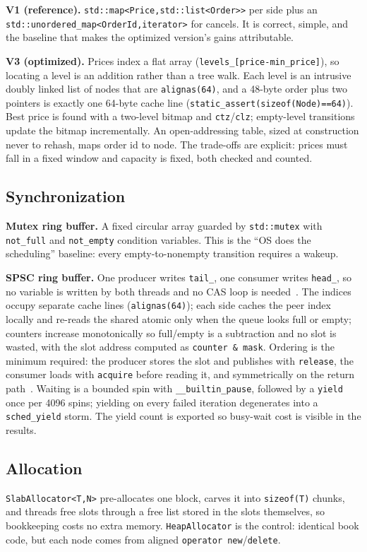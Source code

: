 \documentclass[conference]{IEEEtran}
\begin{document}
\textbf{V1 (reference).} \texttt{std::map<Price,std::list<Order>>} per side plus
an \texttt{std::unordered\_map<OrderId,iterator>} for cancels. It is correct,
simple, and the baseline that makes the optimized version's gains attributable.

\textbf{V3 (optimized).} Prices index a flat array
(\texttt{levels\_[price-min\_price]}), so locating a level is an addition rather
than a tree walk. Each level is an intrusive doubly linked list of nodes that are
\texttt{alignas(64)}, and a 48-byte order plus two pointers is exactly one
64-byte cache line (\texttt{static\_assert(sizeof(Node)==64)}). Best price is
found with a two-level bitmap and \texttt{ctz}/\texttt{clz}; empty-level
transitions update the bitmap incrementally. An open-addressing table, sized at
construction never to rehash, maps order id to node. The trade-offs are explicit:
prices must fall in a fixed window and capacity is fixed, both checked and
counted.

\subsection{Synchronization}
\textbf{Mutex ring buffer.} A fixed circular array guarded by
\texttt{std::mutex} with \texttt{not\_full} and \texttt{not\_empty} condition
variables. This is the ``OS does the scheduling'' baseline: every
empty-to-nonempty transition requires a wakeup.

\textbf{SPSC ring buffer.} One producer writes \texttt{tail\_}, one consumer
writes \texttt{head\_}, so no variable is written by both threads and no CAS loop
is needed~\cite{lamport,michael}. The indices occupy separate cache lines
(\texttt{alignas(64)}); each side caches the peer index locally and re-reads the
shared atomic only when the queue looks full or empty; counters increase
monotonically so full/empty is a subtraction and no slot is wasted, with the slot
address computed as \texttt{counter \& mask}. Ordering is the minimum required:
the producer stores the slot and publishes with \texttt{release}, the consumer
loads with \texttt{acquire} before reading it, and symmetrically on the return
path~\cite{boehm}. Waiting is a bounded spin with \texttt{\_\_builtin\_pause},
followed by a \texttt{yield} once per 4096 spins; yielding on every failed
iteration degenerates into a \texttt{sched\_yield} storm. The yield count is
exported so busy-wait cost is visible in the results.

\subsection{Allocation}
\texttt{SlabAllocator<T,N>} pre-allocates one block, carves it into
\texttt{sizeof(T)} chunks, and threads free slots through a free list stored in
the slots themselves, so bookkeeping costs no extra memory.
\texttt{HeapAllocator} is the control: identical book code, but each node comes
from aligned \texttt{operator new}/\texttt{delete}.
\end{document}
